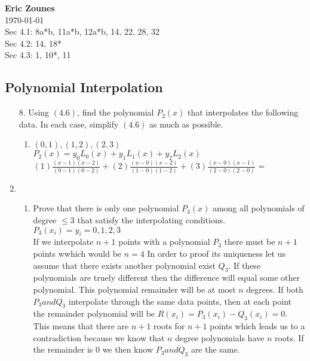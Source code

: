 \documentclass[12pt,letterpaper]{article}
\begin{document}
\begin{flushright}
\end{flushright}
\begin{flushleft}
\textbf{Eric Zounes} \\
\today \\ 
Sec 4.1: 8a*b, 11a*b, 12a*b, 14, 22, 28, 32 \\
Sec 4.2: 14, 18* \\
Sec 4.3: 1, 10*, 11 \\
\end{flushleft}
\subsection{Polynomial Interpolation} 
	\begin{enumerate}
		\item[8.] Using $(4.6)$, find the polynomial $P_{2}(x)$ that interpolates the following data. In each case, simplify $(4.6)$ as much as possible. \\
		\begin{enumerate}
			\item ${(0,1),(1,2),(2,3)}$ \\
			$P_{2}(x) = y_{0}L_{0}(x) + y_{1}L_{1}(x) + y_{2}L_{2}(x)$ \\
			$(1)\frac{(x - 1)(x - 2)}{(0 - 1)(0 - 2)} + (2)\frac{(x - 0)(x - 2)}{(1 - 0)(1 - 2)} +  (3)\frac{(x - 0)(x - 1)}{(2 - 0)(2 - 0)} = $ \\
		\end{enumerate} 
		\item \begin{enumerate} 
			\item Prove that there is only one polynomial $P_{3}(x)$ among all polynomials of degree $\leq 3$ that satisfy the interpolating conditions. \\ 
			$P_{3}(x_{i}) = y_{i}  = 0,1,2,3$ \\
			If we interpolate $n + 1$ points with a polynomial $P_{3}$ there must be $n + 1$ points wwhich would be $n = 4$ In order to proof its uniqueness let us assume that there exists another polynomial exist  $Q_{3}$. If these polynomials are truely different then the difference will equal some other polynomial. This polynomial remainder will be at most $n$ degrees. If both $P_{3} and Q_{3}$ interpolate through the same data points, then at each point the remainder polynomial will be $R(x_{i}) = P_{3}(x_{i}) - Q_{3}(x_{i}) = 0$. This means that there are $n + 1$ roots for $n + 1$ points which leads us to a contradiction because we know that $n$ degree polynomials have $n$ roots. If the remainder is $0$ we then know $P_{3} and Q_{3}$ are the same.  

\end{enumerate}
\end{enumerate}
\end{document}
